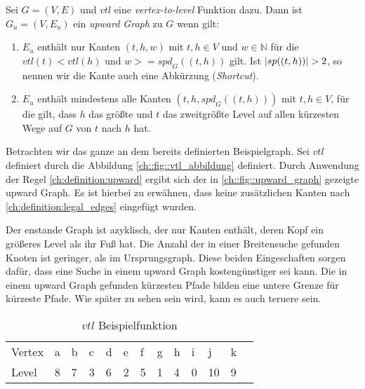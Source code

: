 \begin{definition}
    Sei $G = (V, E)$ und ${vtl}$ eine \emph{vertex-to-level} Funktion dazu. Dann ist $G_u = (V, E_u)$ ein \emph{upward Graph} zu $G$ wenn gilt:
    \begin{enumerate}
        \item\label{ch:definition:legal_edges}
        $E_u$ enthält nur Kanten $(t, h, w)$ mit $t, h \in V$ und $w \in \mathbb{N}$ für die ${vtl}(t) < {vtl}(h)$ und $w >= {spd}_{G}((t, h))$ gilt.
        Ist $\abs{{sp}((t, h))} > 2$, so nennen wir die Kante auch eine Abkürzung (\emph{Shortcut}).

        \item\label{ch:definition:upward}
        $E_u$ enthält mindestens alle Kanten $(t, h, {spd}_{G}((t, h)))$ mit $t, h \in V$, für die gilt, dass $h$ das größte und $t$ das zweitgrößte Level auf allen kürzesten Wege auf $G$ von $t$ nach $h$ hat.
    \end{enumerate}
\end{definition}


Betrachten wir das ganze an dem bereits definierten Beispielgraph.
Sei ${vtl}$ definiert durch die Abbildung \autoref{ch::fig::vtl_abbildung} definiert.
Durch Anwendung der Regel \ref{ch:definition:upward} ergibt sich der in \autoref{ch::fig::upward_graph} gezeigte upward Graph.
Es ist hierbei zu erwähnen, dass keine zusätzlichen Kanten nach \autoref{ch:definition:legal_edges} eingefügt wurden.

Der enstande Graph ist azyklisch, der nur Kanten enthält, deren Kopf ein größeres Level als ihr Fuß hat.
Die Anzahl der in einer Breitensuche gefunden Knoten ist geringer, als im Ursprungsgraph.
Diese beiden Eingeschaften sorgen dafür, dass eine Suche in einem upward Graph kostengünstiger sei kann.
Die in einem upward Graph gefunden kürzesten Pfade bilden eine untere Grenze für kürzeste Pfade.
Wie später  zu sehen sein wird, kann es auch teruere sein.

\begin{table}[ht]
    \centering
    \begin{tabular}{lllllllllllll}
        Vertex & a & b & c & d & e & f & g & h & i & j  & k & \\
        Level  & 8 & 7 & 3 & 6 & 2 & 5 & 1 & 4 & 0 & 10 & 9 &
    \end{tabular}
    \caption{${vtl}$ Beispielfunktion}
    \label{ch::fig::vtl_abbildung}
\end{table}



